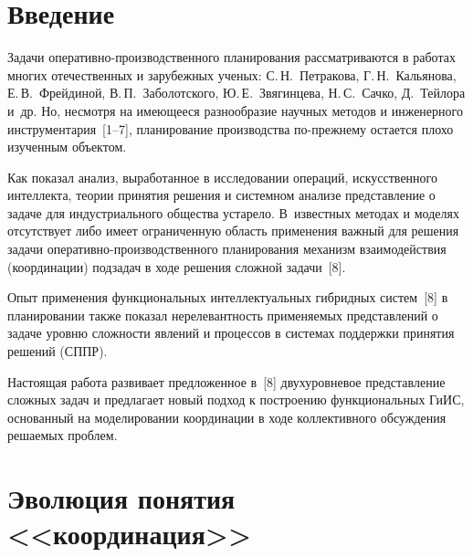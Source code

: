       \begin{multicols}{2}

      \label{st\stat}

\section{Введение}

  Задачи оперативно-производственного планирования рассматриваются в 
работах многих отечественных и зарубежных ученых: С.\,Н.~Петракова, 
Г.\,Н.~Кальянова, Е.\,В.~Фрейдиной, В.\,П.~Заболотского, Ю.\,Е.~Звягинцева, 
Н.\,С.~Сачко, Д.~Тейлора и~др. Но, несмотря на имеющееся разнообразие 
научных методов и инженерного инструментария~[1--7], планирование 
производства по-прежнему остается плохо изученным объектом.
  
  Как показал анализ, выработанное в исследовании операций, искусственного 
интеллекта, теории принятия решения и системном анализе представление о 
задаче для индустриального общества устарело. В~известных методах и 
моделях отсутствует либо имеет ограниченную область применения важный 
для решения задачи опе\-ра\-тив\-но-про\-из\-вод\-ст\-вен\-но\-го планирования 
механизм взаимодействия (координации) подзадач в ходе решения сложной 
задачи~[8].
  
  Опыт применения функциональных интеллектуальных гибридных 
систем~[8] в планировании также показал нерелевантность применяемых 
представлений о задаче уровню сложности явлений и процессов в системах 
поддержки принятия решений (СППР).
  
  Настоящая работа развивает предложенное в~[8] двухуровневое 
представление сложных задач и предлагает новый подход к построению 
функциональных ГиИС, основанный на моделировании координации в ходе 
коллективного обсуждения решаемых проблем.
  
\section{Эволюция понятия <<координация>>}
  

\end{multicols}
